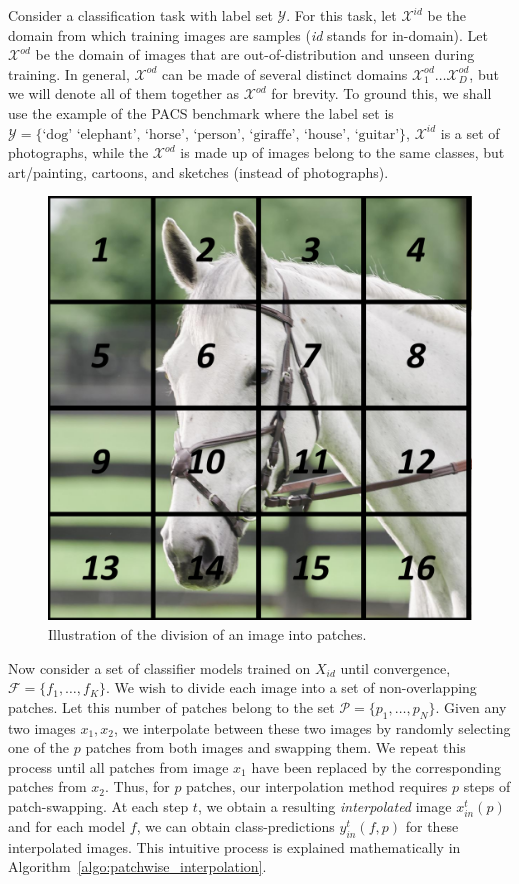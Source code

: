 Consider a classification task with label set $\mathcal{Y}$.
For this task, let $\mathcal{X}^{id}$ be the domain from which training images are samples (\textit{id} stands for in-domain).
Let $\mathcal{X}^{od}$ be the domain of images that are out-of-distribution and unseen during training.
In general, $\mathcal{X}^{od}$ can be made of several distinct domains $\mathcal{X}^{od}_1 \dots \mathcal{X}^{od}_{D}$, but we will denote all of them together as  $\mathcal{X}^{od}$ for brevity.
To ground this, we shall use the example of the PACS benchmark where the label set is $\mathcal{Y} = \{ \textrm{`dog' `elephant', `horse', `person', `giraffe', `house', `guitar'}\}$, $\mathcal{X}^{id}$ is a set of photographs, while the $\mathcal{X}^{od}$ is made up of images belong to the same classes, but art/painting, cartoons, and sketches (instead of photographs).

\begin{figure}
    \centering 
    \includegraphics[width=0.6\linewidth]{figures/patch_grid_horse.pdf}
    \caption{Illustration of the division of an image into patches.}
    \label{fig:patch_grid_horse}
\end{figure}
Now consider a set of classifier models trained on $X_{id}$ until convergence, $\mathcal{F} = \{f_1, \dots, f_K\}$.
We wish to divide each image into a set of non-overlapping patches.
Let this number of patches belong to the set $\mathcal{P}=\{p_1, \dots, p_N\}$.
Given any two images $x_1, x_2$, we interpolate between these two images by randomly selecting one of the $p$ patches from both images and swapping them.
We repeat this process until all patches from image $x_1$ have been replaced by the corresponding patches from $x_2$.
Thus, for $p$ patches, our interpolation method requires $p$ steps of patch-swapping.
At each step $t$, we obtain a resulting \textit{interpolated} image $x_{in}^t (p)$ and for each model $f$, we can obtain class-predictions $y_{in}^t (f, p)$ for these interpolated images.
This intuitive process is explained mathematically in Algorithm~\ref{algo:patchwise_interpolation}.

